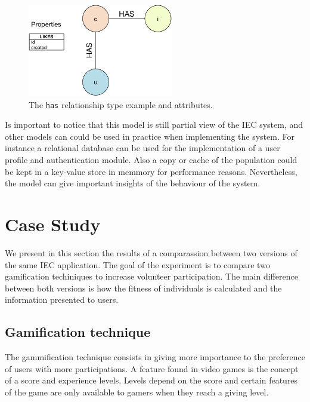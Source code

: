 \documentclass[conference]{IEEEtran}
\begin{document}
  
\begin{figure}[!t]
    \centering
        \includegraphics[width=2.5in]{img/edge_properties_has.png}
    \caption{ The {\tt has} relationship type example and attributes.}
    \label{fig:has}
\end{figure}

Is important to notice that this model is still partial view of the IEC system,
and other models can could be used in practice when implementing the system. 
For instance a relational database can be used for the implementation of a
user profile and authentication module. Also a copy or cache of the population 
could be kept in a key-value store in memmory for performance reasons. 
Nevertheless, the model can give important insights of the behaviour of the 
system.  

\section{Case Study}
\label{sec:experiments}

We present in this section the results of a comparassion between two versions
of the same IEC application. The goal of the experiment is to compare two 
gamification techiniques to increase volunteer participation. 
The main difference between both versions is how the fitness of individuals
is calculated and the information presented to users. 
\subsection{Gamification technique}
\label{sec:gamification}
The gammification technique
consists in giving more importance to the preference of users with more
participations. A feature found in video games is the concept of a 
score and experience levels. Levels depend on the score and certain features
of the game are only available to gamers when they reach a giving level.  
\end{document}
